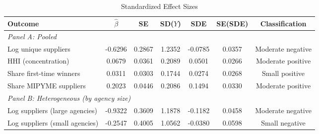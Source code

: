 \begin{table}[t]
\centering
\caption{Standardized Effect Sizes}
\label{tab:sde}
\small
\begin{adjustbox}{max width=\textwidth}
\begin{tabular}{lcccccc}
\hline\hline
Outcome & $\hat{\beta}$ & SE & SD($Y$) & SDE & SE(SDE) & Classification \\
\hline
\multicolumn{7}{l}{\textit{Panel A: Pooled}} \\
Log unique suppliers & -0.6296 & 0.2867 & 1.2352 & -0.0785 & 0.0357 & Moderate negative \\
HHI (concentration) & 0.0679 & 0.0361 & 0.2089 & 0.0501 & 0.0266 & Moderate positive \\
Share first-time winners & 0.0311 & 0.0303 & 0.1744 & 0.0274 & 0.0268 & Small positive \\
Share MIPYME suppliers & 0.2023 & 0.0446 & 0.2086 & 0.1494 & 0.0330 & Moderate positive \\
\hline
\multicolumn{7}{l}{\textit{Panel B: Heterogeneous (by agency size)}} \\
Log suppliers (large agencies) & -0.9322 & 0.3609 & 1.1878 & -0.1182 & 0.0458 & Moderate negative \\
Log suppliers (small agencies) & -0.2547 & 0.4005 & 1.0562 & -0.0380 & 0.0598 & Small negative \\
\hline\hline
\end{tabular}
\end{adjustbox}
\begin{tablenotes}

\end{tablenotes}
\end{table}
